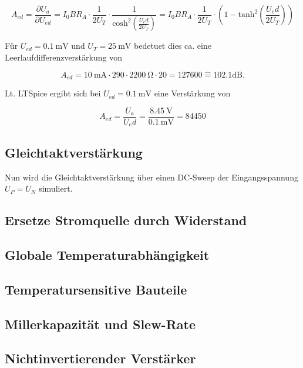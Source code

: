 \begin{equation}
    A_{ed} = \frac{\partial U_a}{\partial U_{ed}} = I_0BR_A \cdot \frac{1}{2U_T} \cdot \frac{1}{\text{cosh}^2\left( \frac{U_ed}{2U_T}  \right)} = I_0BR_A \cdot \frac{1}{2U_T} \cdot \left( 1 - \text{tanh}^2\left(\frac{U_ed}{2U_T} \right) \right)
\end{equation}

Für $U_{ed} = \SI{0.1}{\milli\volt}$ und $U_T = \SI{25}{\milli\volt}$ bedetuet dies ca. eine Leerlaufdifferenzverstärkung von

\begin{equation}
    A_{ed} = \SI{10}{\milli\ampere} \cdot 290 \cdot \SI{2200}{\ohm} \cdot 20 = 127600 \hat{=} 102.1 \text{dB} .
\end{equation}

Lt. LTSpice ergibt sich bei $U_{ed} = \SI{0.1}{\milli\volt}$ eine Verstärkung von

\begin{equation}
    A_{ed} = \frac{U_a}{U_ed} = \frac{\SI{8.45}{\volt}}{\SI{0.1}{\milli\volt}} = 84 450
\end{equation}

\subsection{Gleichtaktverstärkung}
Nun wird die Gleichtaktverstärkung über einen DC-Sweep der Eingangsspannung $U_P = U_N$ simuliert.




\subsection{Ersetze Stromquelle durch Widerstand}

\subsection{Globale Temperaturabhängigkeit}

\subsection{Temperatursensitive Bauteile}

\subsection{Millerkapazität und Slew-Rate}

\subsection{Nichtinvertierender Verstärker}

